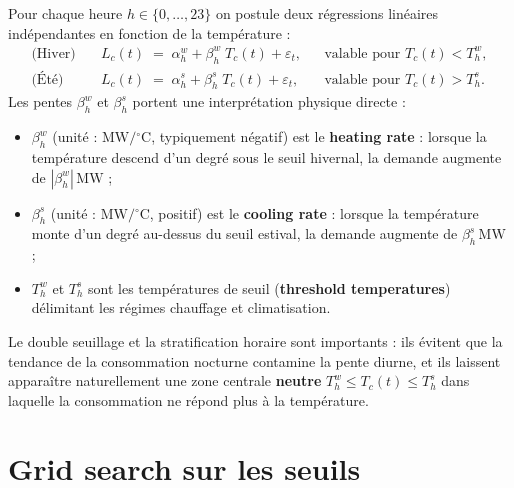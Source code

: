 \documentclass[11pt,a4paper]{article}
\begin{document}
Pour chaque heure $h\in\{0,\ldots,23\}$ on postule deux r\'egressions lin\'eaires ind\'ependantes en fonction de la temp\'erature :
\begin{align}
  \text{(Hiver)}\quad & L_c(t)\;=\;\alpha_h^{w} + \beta_h^{w}\;T_c(t) + \varepsilon_t,
    && \text{valable pour } T_c(t) < T_h^{w}, \label{eq:winter}\\[2pt]
  \text{(\'Et\'e)}\quad & L_c(t)\;=\;\alpha_h^{s} + \beta_h^{s}\;T_c(t) + \varepsilon_t,
    && \text{valable pour } T_c(t) > T_h^{s}. \label{eq:summer}
\end{align}
Les pentes $\beta_h^{w}$ et $\beta_h^{s}$ portent une interpr\'etation physique directe :
\begin{itemize}
  \item $\beta_h^{w}$ (unit\'e : $\mathrm{MW/{}^{\circ}C}$, typiquement n\'egatif) est le \textbf{heating rate} : lorsque la temp\'erature descend d'un degr\'e sous le seuil hivernal, la demande augmente de $|\beta_h^{w}|\,\mathrm{MW}$ ;
  \item $\beta_h^{s}$ (unit\'e : $\mathrm{MW/{}^{\circ}C}$, positif) est le \textbf{cooling rate} : lorsque la temp\'erature monte d'un degr\'e au-dessus du seuil estival, la demande augmente de $\beta_h^{s}\,\mathrm{MW}$ ;
  \item $T_h^{w}$ et $T_h^{s}$ sont les temp\'eratures de seuil (\textbf{threshold temperatures}) d\'elimitant les r\'egimes chauffage et climatisation.
\end{itemize}
Le double seuillage et la stratification horaire sont importants : ils \'evitent que la tendance de la consommation nocturne contamine la pente diurne, et ils laissent appara\^itre naturellement une zone centrale \textbf{neutre} $T_h^{w}\leq T_c(t) \leq T_h^{s}$ dans laquelle la consommation ne r\'epond plus \`a la temp\'erature.

\section{Grid search sur les seuils}
\end{document}
